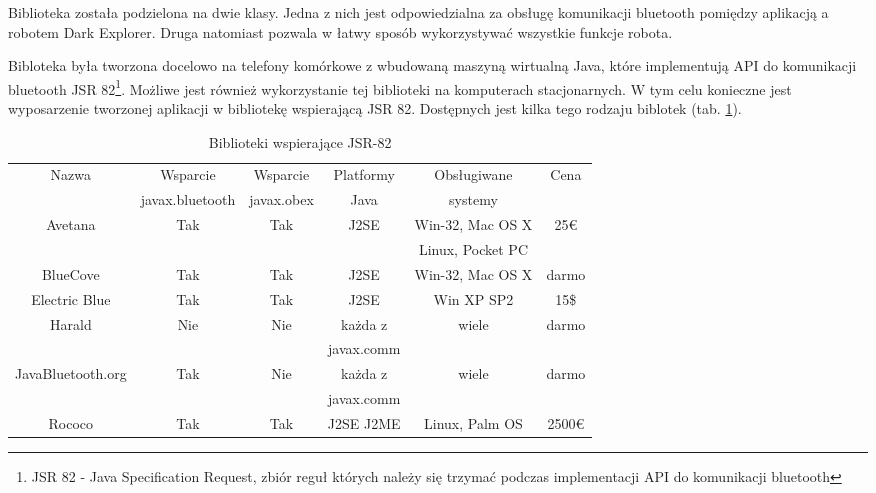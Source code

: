 Biblioteka została podzielona na dwie klasy. Jedna z nich jest odpowiedzialna za
obsługę komunikacji bluetooth pomiędzy aplikacją a robotem Dark Explorer. Druga
natomiast pozwala w łatwy sposób wykorzystywać wszystkie funkcje robota.

Bibloteka była tworzona docelowo na telefony komórkowe z wbudowaną maszyną
wirtualną Java, które implementują API do komunikacji bluetooth JSR
82\footnote{JSR 82 - Java Specification Request, zbiór reguł których należy się
trzymać podczas implementacji API do komunikacji bluetooth}. Możliwe jest również
wykorzystanie tej biblioteki na komputerach stacjonarnych. W tym celu konieczne
jest wyposarzenie tworzonej aplikacji w bibliotekę wspierającą JSR 82. Dostępnych
jest kilka tego rodzaju biblotek (tab. \ref{tab:JSR82SDK}).

\begin{table}[hb]
  \centering
  \caption{Biblioteki wspierające JSR-82\cite{website:javabluetooth.com}}
  \begin{tabular}{ | c | c | c | c | c | c |} \hline
    Nazwa & Wsparcie & Wsparcie & Platformy & Obsługiwane & Cena \\
    & javax.bluetooth & javax.obex & Java & systemy & \\ \hline
    Avetana & Tak & Tak & J2SE & Win-32, Mac OS X & 25\euro \\
    & & & & Linux, Pocket PC & \\ \hline
    BlueCove & Tak & Tak & J2SE & Win-32, Mac OS X & darmo \\ \hline
    Electric Blue & Tak & Tak & J2SE & Win XP SP2 & 15\$ \\ \hline
    Harald & Nie & Nie & każda z  & wiele & darmo \\
    & & & javax.comm  &  & \\ \hline
    JavaBluetooth.org & Tak & Nie & każda z  & wiele & darmo \\
    & & & javax.comm  &  & \\ \hline
    Rococo & Tak & Tak & J2SE J2ME & Linux, Palm OS & 2500\euro \\ \hline
  \end{tabular}
  \label{tab:JSR82SDK}
\end{table}